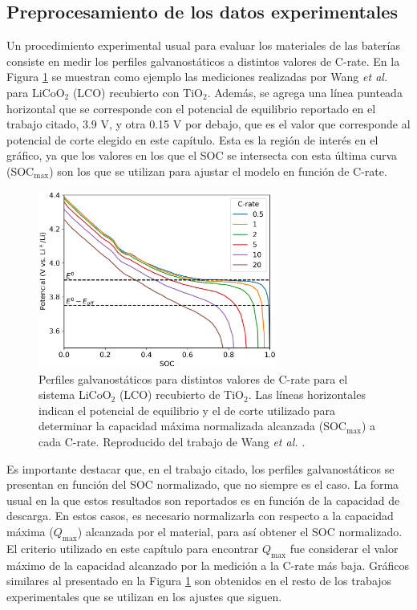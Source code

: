 \subsection{Preprocesamiento de los datos experimentales}

Un procedimiento experimental usual para evaluar los materiales de las baterías
consiste en medir los perfiles galvanostáticos a distintos valores de C-rate.
En la Figura \ref{fig:preproc} se muestran como ejemplo las mediciones realizadas
por Wang \textit{et al.} \cite{wang2019high} para LiCoO$_2$ (LCO) recubierto con 
TiO$_2$. Además, se agrega una línea punteada horizontal que se corresponde
con el potencial de equilibrio reportado en el trabajo citado, 3.9 V, y otra
0.15 V por debajo, que es el valor que corresponde al potencial de corte
elegido en este capítulo. Esta es la región de interés en el gráfico, ya que 
los valores en los que el SOC se intersecta con esta última curva (SOC$_{\max}$)
son los que se utilizan para ajustar el modelo en función de C-rate.
\begin{figure}[h!]
    \centering
    \includegraphics[width=0.7\textwidth]{FastCharging/un/resultados/preprocesamiento/preprocesamiento.png}
    \caption{Perfiles galvanostáticos para distintos valores de C-rate para el
    sistema LiCoO$_2$ (LCO) recubierto de TiO$_2$. Las líneas horizontales indican el 
    potencial de equilibrio y el de corte utilizado para determinar la 
    capacidad máxima normalizada alcanzada (SOC$_{\max}$) a cada C-rate. 
    Reproducido del trabajo de Wang \textit{et al.} \cite{wang2019high}.}
    \label{fig:preproc}
\end{figure}

Es importante destacar que, en el trabajo citado, los perfiles galvanostáticos
se presentan en función del SOC normalizado, que no siempre es el caso. La 
forma usual en la que estos resultados son reportados es en función de la 
capacidad de descarga. En estos casos, es necesario normalizarla con respecto
a la capacidad máxima ($Q_{\max}$) alcanzada por el material, para así obtener
el SOC normalizado. El criterio utilizado en este capítulo para encontrar 
$Q_{\max}$ fue considerar el valor máximo de la capacidad alcanzado por la 
medición a la C-rate más baja. Gráficos similares al presentado en la Figura 
\ref{fig:preproc} son obtenidos en el resto de los trabajos experimentales que
se utilizan en los ajustes que siguen.
